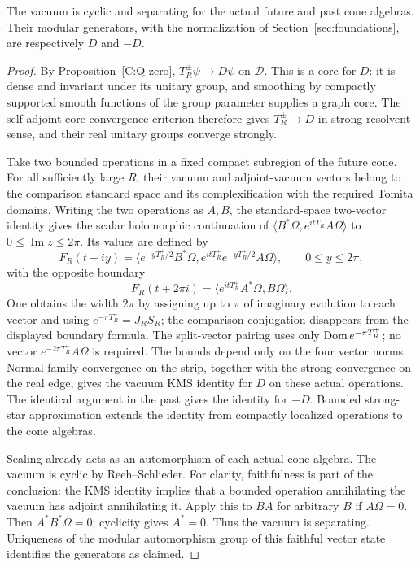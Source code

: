 \begin{theorem}\label{C:cone-modularity}
The vacuum is cyclic and separating for the actual
future and past cone algebras. Their modular generators,
with the normalization of Section~\ref{sec:foundations},
are respectively $D$ and $-D$.
\end{theorem}

\begin{proof}
By Proposition~\ref{C:Q-zero},
$T_R^\pm\psi\to D\psi$ on $\mathscr D$. This is a
core for $D$: it is dense and invariant under its
unitary group, and smoothing by compactly supported
smooth functions of the group parameter supplies a
graph core. The self-adjoint core convergence criterion
therefore gives $T_R^\pm\to D$ in strong resolvent
sense, and their real unitary groups converge strongly.

Take two bounded operations in a fixed compact
subregion of the future cone. For all sufficiently
large $R$, their vacuum and adjoint-vacuum vectors
belong to the comparison standard space and its
complexification with the required Tomita domains.
Writing the two operations as $A,B$, the standard-space
two-vector identity gives the scalar holomorphic continuation
of $\langle B^*\Omega,e^{itT_R^+}A\Omega\rangle$ to
$0\le\operatorname{Im}z\le2\pi$. Its values are defined by
\[
 F_R(t+iy)=
 \big\langle e^{-yT_R^+/2}B^*\Omega,
 e^{itT_R^+}e^{-yT_R^+/2}A\Omega\big\rangle,
 \qquad 0\le y\le2\pi,
\]
with the opposite boundary
\[
 F_R(t+2\pi i)
 =\langle e^{itT_R^+}A^*\Omega,B\Omega\rangle.
\]
One obtains the width $2\pi$ by assigning up to $\pi$
of imaginary evolution to each vector and using
$e^{-\pi T_R^+}=J_RS_R$; the comparison conjugation
disappears from the displayed boundary formula. The split-vector
pairing uses only $\operatorname{Dom} e^{-\pi T_R^+}$; no vector
$e^{-2\pi T_R^+}A\Omega$ is required.
The bounds depend only on the four vector norms.
Normal-family convergence
on the strip, together with the strong convergence on
the real edge, gives the vacuum KMS identity for $D$
on these actual operations. The identical argument
in the past gives the identity for $-D$. Bounded
strong-star approximation extends the identity from
compactly localized operations to the cone algebras.

Scaling already acts as an automorphism of each actual
cone algebra. The vacuum is cyclic by Reeh--Schlieder.
For clarity, faithfulness is part of the conclusion:
the KMS identity implies that a bounded operation
annihilating the vacuum has adjoint annihilating it.
Apply this to $BA$ for arbitrary $B$ if $A\Omega=0$.
Then $A^*B^*\Omega=0$; cyclicity gives $A^*=0$.
Thus the vacuum is separating. Uniqueness of the
modular automorphism group of this faithful vector
state identifies the generators as claimed.
\end{proof}

